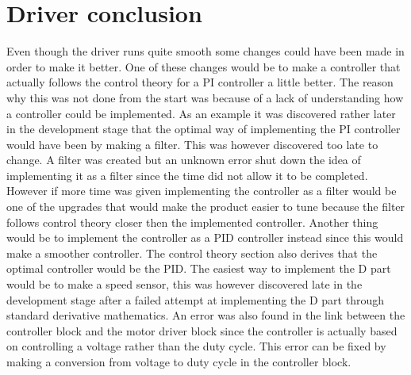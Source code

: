 \section{Driver conclusion}

Even though the driver runs quite smooth some changes could have been made in order to make it better. One of these changes would be to make a controller that actually follows the control theory for a PI controller a little better. The reason why this was not done from the start was because of a lack of understanding how a controller could be implemented. As an example it was discovered rather later in the development stage that the optimal way of implementing the PI controller would have been by making a filter. This was however discovered too late to change. A filter was created but an unknown error shut down the idea of implementing it as a filter since the time did not allow it to be completed. However if more time was given implementing the controller as a filter would be one of the upgrades that would make the product easier to tune because the filter follows control theory closer then the implemented controller.
Another thing would be to implement the controller as a PID controller instead since this would make a smoother controller. The control theory section also derives that the optimal controller would be the PID. The easiest way to implement the D part would be to make a speed sensor, this was however discovered late in the development stage after a failed attempt at implementing the D part through standard derivative mathematics.
An error was also found in the link between the controller block and the motor driver block since the controller is actually based on controlling a voltage rather than the duty cycle. This  error can be fixed by making a conversion from voltage to duty cycle in the controller block.
